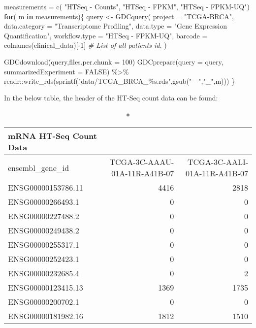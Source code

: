 \documentclass[
]{book}
\newenvironment{Shaded}{\begin{snugshade}}{\end{snugshade}}
\newcommand{\AttributeTok}[1]{\textcolor[rgb]{0.77,0.63,0.00}{#1}}
\newcommand{\CommentTok}[1]{\textcolor[rgb]{0.56,0.35,0.01}{\textit{#1}}}
\newcommand{\ConstantTok}[1]{\textcolor[rgb]{0.00,0.00,0.00}{#1}}
\newcommand{\ControlFlowTok}[1]{\textcolor[rgb]{0.13,0.29,0.53}{\textbf{#1}}}
\newcommand{\DecValTok}[1]{\textcolor[rgb]{0.00,0.00,0.81}{#1}}
\newcommand{\FunctionTok}[1]{\textcolor[rgb]{0.00,0.00,0.00}{#1}}
\newcommand{\NormalTok}[1]{#1}
\newcommand{\OtherTok}[1]{\textcolor[rgb]{0.56,0.35,0.01}{#1}}
\newcommand{\SpecialCharTok}[1]{\textcolor[rgb]{0.00,0.00,0.00}{#1}}
\newcommand{\StringTok}[1]{\textcolor[rgb]{0.31,0.60,0.02}{#1}}
\begin{document}
\begin{Shaded}
\begin{Highlighting}[]
\NormalTok{measurements }\OtherTok{=} \FunctionTok{c}\NormalTok{( }\StringTok{"HTSeq {-} Counts"}\NormalTok{, }\StringTok{"HTSeq {-} FPKM"}\NormalTok{, }\StringTok{"HTSeq {-} FPKM{-}UQ"}\NormalTok{)}
\ControlFlowTok{for}\NormalTok{( m }\ControlFlowTok{in}\NormalTok{ measurements)\{}
\NormalTok{  query }\OtherTok{\textless{}{-}} \FunctionTok{GDCquery}\NormalTok{(}
    \AttributeTok{project =} \StringTok{"TCGA{-}BRCA"}\NormalTok{, }
    \AttributeTok{data.category =} \StringTok{"Transcriptome Profiling"}\NormalTok{, }
    \AttributeTok{data.type =} \StringTok{"Gene Expression Quantification"}\NormalTok{, }
    \AttributeTok{workflow.type =} \StringTok{"HTSeq {-} FPKM{-}UQ"}\NormalTok{,}
    \AttributeTok{barcode =}  \FunctionTok{colnames}\NormalTok{(clinical\_data)[}\SpecialCharTok{{-}}\DecValTok{1}\NormalTok{] }\CommentTok{\# List of all patients id.}
\NormalTok{  )}
  
  \FunctionTok{GDCdownload}\NormalTok{(query,}\AttributeTok{files.per.chunk =} \DecValTok{100}\NormalTok{)}
   \FunctionTok{GDCprepare}\NormalTok{(}\AttributeTok{query =}\NormalTok{ query, }\AttributeTok{summarizedExperiment =} \ConstantTok{FALSE}\NormalTok{) }\SpecialCharTok{\%\textgreater{}\%} 
\NormalTok{  readr}\SpecialCharTok{::}\FunctionTok{write\_rds}\NormalTok{(}\FunctionTok{sprintf}\NormalTok{(}\StringTok{"data/TCGA\_BRCA\_\%s.rds"}\NormalTok{,}\FunctionTok{gsub}\NormalTok{(}\StringTok{" {-} "}\NormalTok{,}\StringTok{"\_"}\NormalTok{,m)))}
\NormalTok{\}}
\end{Highlighting}
\end{Shaded}

In the below table, the header of the HT-Seq count data can be found:

\captionsetup[table]{labelformat=empty,skip=1pt}
\begin{longtable}{lrr}
\caption*{
{\large mRNA HT-Seq Count Data}
} \\ 
\toprule
ensembl\_gene\_id & TCGA-3C-AAAU-01A-11R-A41B-07 & TCGA-3C-AALI-01A-11R-A41B-07 \\ 
\midrule
ENSG00000153786.11 & 4416 & 2818 \\ 
ENSG00000266493.1 & 0 & 0 \\ 
ENSG00000227488.2 & 0 & 0 \\ 
ENSG00000249438.2 & 0 & 0 \\ 
ENSG00000255317.1 & 0 & 0 \\ 
ENSG00000252423.1 & 0 & 0 \\ 
ENSG00000232685.4 & 0 & 2 \\ 
ENSG00000123415.13 & 1369 & 1735 \\ 
ENSG00000200702.1 & 0 & 0 \\ 
ENSG00000181982.16 & 1812 & 1510 \\ 
 \bottomrule
\end{longtable}
\end{document}
